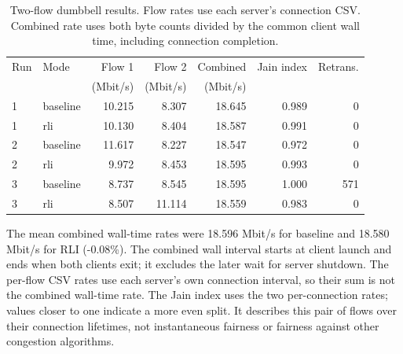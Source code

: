 \begin{table}[H]\centering\small
\begin{tabular}{llrrrrr}\toprule
Run & Mode & Flow 1 & Flow 2 & Combined & Jain index & Retrans.\\
 & & (Mbit/s) & (Mbit/s) & (Mbit/s) & & \\\midrule
1 & baseline & 10.215 & 8.307 & 18.645 & 0.989 & 0 \\
1 & rli & 10.130 & 8.404 & 18.587 & 0.991 & 0 \\
2 & baseline & 11.617 & 8.227 & 18.547 & 0.972 & 0 \\
2 & rli & 9.972 & 8.453 & 18.595 & 0.993 & 0 \\
3 & baseline & 8.737 & 8.545 & 18.595 & 1.000 & 571 \\
3 & rli & 8.507 & 11.114 & 18.559 & 0.983 & 0 \\
\bottomrule\end{tabular}
\caption{Two-flow dumbbell results. Flow rates use each server's connection CSV. Combined rate uses both byte counts divided by the common client wall time, including connection completion.}\end{table}
The mean combined wall-time rates were 18.596 Mbit/s for baseline and 18.580 Mbit/s for RLI (-0.08\%). The combined wall interval starts at client launch and ends when both clients exit; it excludes the later wait for server shutdown. The per-flow CSV rates use each server's own connection interval, so their sum is not the combined wall-time rate. The Jain index uses the two per-connection rates; values closer to one indicate a more even split. It describes this pair of flows over their connection lifetimes, not instantaneous fairness or fairness against other congestion algorithms.
